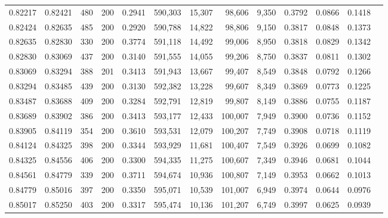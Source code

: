 \begin{tabular}{rrrrrrrrrrrrr}
0.82217 & 0.82421 &   480 & 200 &                                     0.2941 & 590,303 &  15,307 &  98,606 &   9,350 & 0.3792 & 0.0866 & 0.1418 \\
0.82424 & 0.82635 &   485 & 200 &                                     0.2920 & 590,788 &  14,822 &  98,806 &   9,150 & 0.3817 & 0.0848 & 0.1373 \\
0.82635 & 0.82830 &   330 & 200 &                                     0.3774 & 591,118 &  14,492 &  99,006 &   8,950 & 0.3818 & 0.0829 & 0.1342 \\
0.82830 & 0.83069 &   437 & 200 &                                     0.3140 & 591,555 &  14,055 &  99,206 &   8,750 & 0.3837 & 0.0811 & 0.1302 \\
0.83069 & 0.83294 &   388 & 201 &                                     0.3413 & 591,943 &  13,667 &  99,407 &   8,549 & 0.3848 & 0.0792 & 0.1266 \\
0.83294 & 0.83485 &   439 & 200 &                                     0.3130 & 592,382 &  13,228 &  99,607 &   8,349 & 0.3869 & 0.0773 & 0.1225 \\
0.83487 & 0.83688 &   409 & 200 &                                     0.3284 & 592,791 &  12,819 &  99,807 &   8,149 & 0.3886 & 0.0755 & 0.1187 \\
0.83689 & 0.83902 &   386 & 200 &                                     0.3413 & 593,177 &  12,433 & 100,007 &   7,949 & 0.3900 & 0.0736 & 0.1152 \\
0.83905 & 0.84119 &   354 & 200 &                                     0.3610 & 593,531 &  12,079 & 100,207 &   7,749 & 0.3908 & 0.0718 & 0.1119 \\
0.84124 & 0.84325 &   398 & 200 &                                     0.3344 & 593,929 &  11,681 & 100,407 &   7,549 & 0.3926 & 0.0699 & 0.1082 \\
0.84325 & 0.84556 &   406 & 200 &                                     0.3300 & 594,335 &  11,275 & 100,607 &   7,349 & 0.3946 & 0.0681 & 0.1044 \\
0.84561 & 0.84779 &   339 & 200 &                                     0.3711 & 594,674 &  10,936 & 100,807 &   7,149 & 0.3953 & 0.0662 & 0.1013 \\
0.84779 & 0.85016 &   397 & 200 &                                     0.3350 & 595,071 &  10,539 & 101,007 &   6,949 & 0.3974 & 0.0644 & 0.0976 \\
0.85017 & 0.85250 &   403 & 200 &                                     0.3317 & 595,474 &  10,136 & 101,207 &   6,749 & 0.3997 & 0.0625 & 0.0939 \\

\end{tabular}
